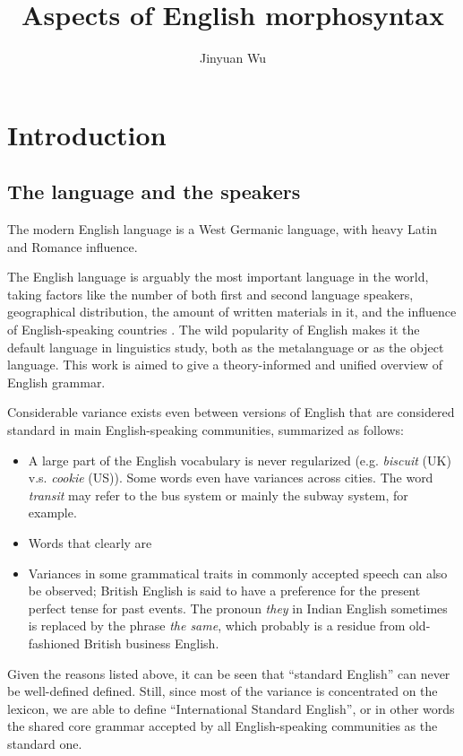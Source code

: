 \documentclass[UTF8, a4paper, oneside, scheme=plain, 12pt]{ctexbook}
\title{Aspects of English morphosyntax}
\author{Jinyuan Wu}
\newcommand*{\citepage}[1]{p.~{#1}}
\newcommand{\form}[1]{\emph{#1}}
\begin{document}
    
\maketitle

\automath

\tableofcontents

\chapter{Introduction}

\section{The language and the speakers}

The modern English language is a West Germanic language,
with heavy Latin and Romance influence. 

The English language is arguably the most important language in the world,
taking factors like the number of both first and second language speakers,
geographical distribution,
the amount of written materials in it,
and the influence of English-speaking countries \citep[\citepage{3}]{quirk1985}.
The wild popularity of English 
makes it the default language in linguistics study,
both as the metalanguage or as the object language.
This work is aimed to give a theory-informed and unified overview of English grammar.

Considerable variance exists even between 
versions of English that are considered standard 
in main English-speaking communities,
summarized as follows:
\begin{itemize}
    \item A large part of the English vocabulary is never regularized
    (e.g. \form{biscuit} (UK) v.s. \form{cookie} (US)).
    Some words even have variances across cities.
    The word \form{transit} may refer to the bus system 
    or mainly the subway system, for example.
    \item Words that clearly are 
    \item Variances in some grammatical traits in commonly accepted speech can also be observed;
    British English is said to have a preference for 
    the present perfect tense for past events.
    The pronoun \form{they} in Indian English sometimes is replaced by the phrase \form{the same},
    which probably is a residue from old-fashioned British business English.
\end{itemize}
Given the reasons listed above, 
it can be seen that ``standard English'' can never be well-defined defined.
Still, since most of the variance is concentrated on the lexicon, 
we are able to define  ``International Standard English'',
or in other words the shared core grammar 
accepted by all English-speaking communities as the standard one.
\end{document}
